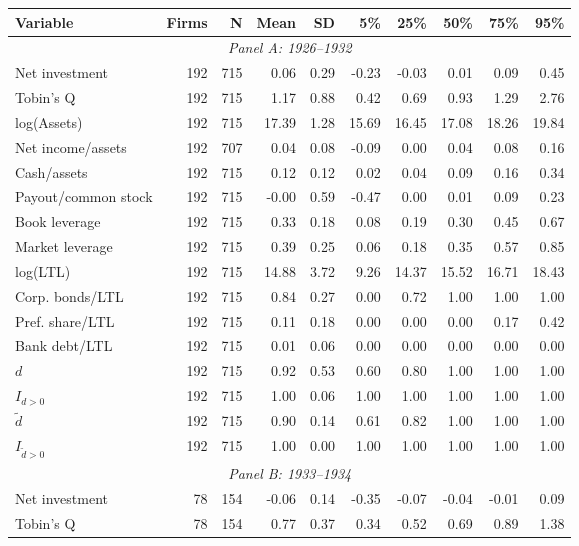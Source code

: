 \begin{threeparttable}
\begin{tabular}{lrrrrrrrrr}
\toprule
Variable & Firms & N & Mean & SD & 5\% & 25\% & 50\% & 75\% & 95\% \\
\midrule
\multicolumn{10}{c}{\textit{Panel A: 1926--1932}} \\
\midrule
Net investment & 192 & 715 & 0.06 & 0.29 & -0.23 & -0.03 & 0.01 & 0.09 & 0.45 \\
Tobin's Q & 192 & 715 & 1.17 & 0.88 & 0.42 & 0.69 & 0.93 & 1.29 & 2.76 \\
log(Assets) & 192 & 715 & 17.39 & 1.28 & 15.69 & 16.45 & 17.08 & 18.26 & 19.84 \\
Net income/assets & 192 & 707 & 0.04 & 0.08 & -0.09 & 0.00 & 0.04 & 0.08 & 0.16 \\
Cash/assets & 192 & 715 & 0.12 & 0.12 & 0.02 & 0.04 & 0.09 & 0.16 & 0.34 \\
Payout/common stock & 192 & 715 & -0.00 & 0.59 & -0.47 & 0.00 & 0.01 & 0.09 & 0.23 \\
Book leverage & 192 & 715 & 0.33 & 0.18 & 0.08 & 0.19 & 0.30 & 0.45 & 0.67 \\
Market leverage & 192 & 715 & 0.39 & 0.25 & 0.06 & 0.18 & 0.35 & 0.57 & 0.85 \\
log(LTL) & 192 & 715 & 14.88 & 3.72 & 9.26 & 14.37 & 15.52 & 16.71 & 18.43 \\
Corp. bonds/LTL & 192 & 715 & 0.84 & 0.27 & 0.00 & 0.72 & 1.00 & 1.00 & 1.00 \\
Pref. share/LTL & 192 & 715 & 0.11 & 0.18 & 0.00 & 0.00 & 0.00 & 0.17 & 0.42 \\
Bank debt/LTL & 192 & 715 & 0.01 & 0.06 & 0.00 & 0.00 & 0.00 & 0.00 & 0.00 \\
\ensuremath{d} & 192 & 715 & 0.92 & 0.53 & 0.60 & 0.80 & 1.00 & 1.00 & 1.00 \\
\ensuremath{I_{d>0}} & 192 & 715 & 1.00 & 0.06 & 1.00 & 1.00 & 1.00 & 1.00 & 1.00 \\
\ensuremath{\tilde{d}} & 192 & 715 & 0.90 & 0.14 & 0.61 & 0.82 & 1.00 & 1.00 & 1.00 \\
\ensuremath{I_{\tilde{d}>0}} & 192 & 715 & 1.00 & 0.00 & 1.00 & 1.00 & 1.00 & 1.00 & 1.00 \\
\midrule
\multicolumn{10}{c}{\textit{Panel B: 1933--1934}} \\
\midrule
Net investment & 78 & 154 & -0.06 & 0.14 & -0.35 & -0.07 & -0.04 & -0.01 & 0.09 \\
Tobin's Q & 78 & 154 & 0.77 & 0.37 & 0.34 & 0.52 & 0.69 & 0.89 & 1.38 \\

\end{tabular}
\end{threeparttable}
